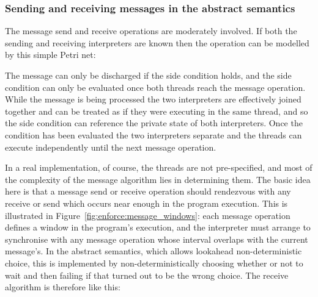 \subsubsection{Sending and receiving messages in the abstract semantics}

The message send and receive operations are moderately involved.  If
both the sending and receiving interpreters are known then the
operation can be modelled by this simple Petri net:


The message can only be discharged if the side condition holds, and
the side condition can only be evaluated once both threads reach the
message operation.  While the message is being processed the two
interpreters are effectively joined together and can be treated as if
they were executing in the same thread, and so the side condition can
reference the private state of both interpreters.  Once the condition
has been evaluated the two interpreters separate and the threads can
execute independently until the next message operation.

In a real implementation, of course, the threads are not
pre-specified, and most of the complexity of the message algorithm
lies in determining them.  The basic idea here is that a message send
or receive operation should rendezvous with any receive or send which
occurs near enough in the program execution.  This is illustrated in
Figure~\ref{fig:enforce:message_windows}: each message operation
defines a window in the program's execution, and the interpreter must
arrange to synchronise with any message operation whose interval
overlaps with the current message's.  In the abstract semantics, which
allows lookahead non-deterministic choice, this is implemented by
non-deterministically choosing whether or not to wait and then failing
if that turned out to be the wrong choice.  The receive algorithm is
therefore like this:

